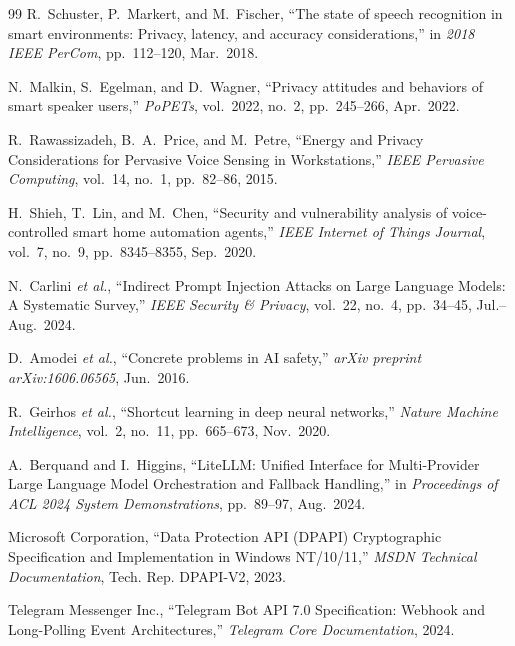 \documentclass[12pt,letterpaper,oneside]{report}
\begin{document}
\begin{thebibliography}{99}
R.~Schuster, P.~Markert, and M.~Fischer,
``The state of speech recognition in smart environments: Privacy, latency, and accuracy considerations,''
in \textit{2018 IEEE PerCom}, pp.~112--120, Mar.~2018.

N.~Malkin, S.~Egelman, and D.~Wagner,
``Privacy attitudes and behaviors of smart speaker users,''
\textit{PoPETs}, vol.~2022, no.~2, pp.~245--266, Apr.~2022.

R.~Rawassizadeh, B.~A.~Price, and M.~Petre,
``Energy and Privacy Considerations for Pervasive Voice Sensing in Workstations,''
\textit{IEEE Pervasive Computing}, vol.~14, no.~1, pp.~82--86, 2015.

H.~Shieh, T.~Lin, and M.~Chen,
``Security and vulnerability analysis of voice-controlled smart home automation agents,''
\textit{IEEE Internet of Things Journal}, vol.~7, no.~9, pp.~8345--8355, Sep.~2020.

N.~Carlini \textit{et al.},
``Indirect Prompt Injection Attacks on Large Language Models: A Systematic Survey,''
\textit{IEEE Security \& Privacy}, vol.~22, no.~4, pp.~34--45, Jul.–Aug.~2024.

D.~Amodei \textit{et al.},
``Concrete problems in AI safety,''
\textit{arXiv preprint arXiv:1606.06565}, Jun.~2016.

R.~Geirhos \textit{et al.},
``Shortcut learning in deep neural networks,''
\textit{Nature Machine Intelligence}, vol.~2, no.~11, pp.~665--673, Nov.~2020.

A.~Berquand and I.~Higgins,
``LiteLLM: Unified Interface for Multi-Provider Large Language Model Orchestration and Fallback Handling,''
in \textit{Proceedings of ACL 2024 System Demonstrations}, pp.~89--97, Aug.~2024.

Microsoft Corporation,
``Data Protection API (DPAPI) Cryptographic Specification and Implementation in Windows NT/10/11,''
\textit{MSDN Technical Documentation}, Tech. Rep. DPAPI-V2, 2023.

Telegram Messenger Inc.,
``Telegram Bot API 7.0 Specification: Webhook and Long-Polling Event Architectures,''
\textit{Telegram Core Documentation}, 2024.

\end{thebibliography}

\appendix
\end{document}
